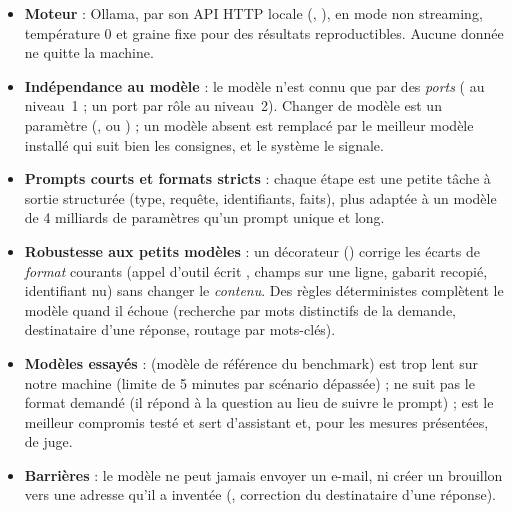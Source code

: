 \begin{itemize}
  \item \textbf{Moteur} : Ollama, par son API HTTP locale (, ), en mode non streaming, température 0 et graine fixe pour des résultats reproductibles. Aucune donnée ne quitte la machine.
  \item \textbf{Indépendance au modèle} : le modèle n'est connu que par des \emph{ports} ( au niveau~1 ; un port par rôle au niveau~2). Changer de modèle est un paramètre (,  ou ) ; un modèle absent est remplacé par le meilleur modèle installé qui suit bien les consignes, et le système le signale.
  \item \textbf{Prompts courts et formats stricts} : chaque étape est une petite tâche à sortie structurée (type, requête, identifiants, faits), plus adaptée à un modèle de 4 milliards de paramètres qu'un prompt unique et long.
  \item \textbf{Robustesse aux petits modèles} : un décorateur () corrige les écarts de \emph{format} courants (appel d'outil écrit , champs sur une ligne, gabarit recopié, identifiant nu) sans changer le \emph{contenu}. Des règles déterministes complètent le modèle quand il échoue (recherche par mots distinctifs de la demande, destinataire d'une réponse, routage par mots-clés).
  \item \textbf{Modèles essayés} :  (modèle de référence du benchmark) est trop lent sur notre machine (limite de 5 minutes par scénario dépassée) ;  ne suit pas le format demandé (il répond à la question au lieu de suivre le prompt) ;  est le meilleur compromis testé et sert d'assistant et, pour les mesures présentées, de juge.
  \item \textbf{Barrières} : le modèle ne peut jamais envoyer un e-mail, ni créer un brouillon vers une adresse qu'il a inventée (, correction du destinataire d'une réponse).
\end{itemize}
